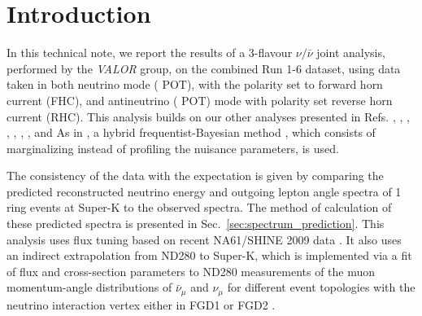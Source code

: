 
\section {Introduction}
\label{sec:intro}

In this technical note, we report the results of a 3-flavour $\nu/\bar{\nu}$ joint analysis,
performed by the {\em VALOR} group,        
on the combined Run 1-6 dataset, using data taken in both 
neutrino mode (\TotalPotNu{} POT),
with the polarity set to forward horn current (FHC),
and antineutrino (\TotalPotNuBar{} POT) mode
with polarity set reverse horn current (RHC).
This analysis builds on our other analyses presented in Refs. 
\cite{OurRun1DisappAnalysis},
\cite{OurRun12DisappAnalysis}, 
\cite{OurRun12DisappAnalysis3Flavour},
\cite{OurRun123DisappAnalysis3Flavour},
\cite{OurRun1234aDisappAnalysis3Flavour},
\cite{OurRun1234DisappAnalysis3Flavour},
\cite{OurRun123JointOscillationAnalysis},
\cite{OurRun1234JointOscillationAnalysis} 
\cite{OurRun56AntiNumuDisappearanceAnalysis3Flavour}
and
\cite{OurRun56AntiNueBarAppearanceAnalysis3Flavour}
As in \cite{OurRun56AntiNueBarAppearanceAnalysis3Flavour},
a hybrid frequentist-Bayesian method \cite{CousinsHighland}, 
which consists of marginalizing instead of profiling 
the nuisance parameters, is used.

The consistency of the data with the expectation is given by comparing the predicted reconstructed neutrino energy 
and outgoing lepton angle spectra of 1 ring events at Super-K to the observed spectra. 
The method of calculation of these predicted spectra is presented in Sec.~\ref{sec:spectrum_prediction}.
This analysis uses flux tuning based on recent NA61/SHINE 2009 data \cite{FluxTuning}\cite{NA61/SHINET2K}. 
It also uses an indirect extrapolation from ND280 to Super-K, which is implemented via a fit of flux and cross-section parameters to
ND280 measurements of the muon momentum-angle distributions of $\bar{\nu}_\mu$ and  $\nu_\mu$
for different event topologies
with the neutrino interaction vertex either in FGD1 or FGD2 \cite{BANFF2016}.


